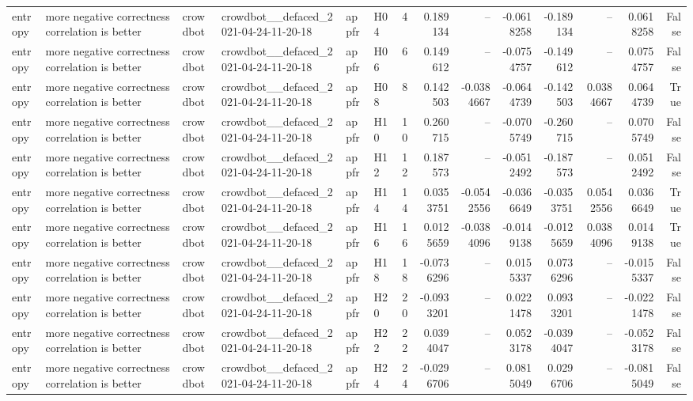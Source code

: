 \begin{longtable}{llllllrrrrrrrr}
entropy & more negative correctness correlation is better & crowdbot & crowdbot\_\_defaced\_2021-04-24-11-20-18 & appfr & H04 & 4 & 0.189134 & -- & -0.0618258 & -0.189134 & -- & 0.0618258 & False \\
entropy & more negative correctness correlation is better & crowdbot & crowdbot\_\_defaced\_2021-04-24-11-20-18 & appfr & H06 & 6 & 0.149612 & -- & -0.0754757 & -0.149612 & -- & 0.0754757 & False \\
entropy & more negative correctness correlation is better & crowdbot & crowdbot\_\_defaced\_2021-04-24-11-20-18 & appfr & H08 & 8 & 0.142503 & -0.0384667 & -0.0644739 & -0.142503 & 0.0384667 & 0.0644739 & True \\
entropy & more negative correctness correlation is better & crowdbot & crowdbot\_\_defaced\_2021-04-24-11-20-18 & appfr & H10 & 10 & 0.260715 & -- & -0.0705749 & -0.260715 & -- & 0.0705749 & False \\
entropy & more negative correctness correlation is better & crowdbot & crowdbot\_\_defaced\_2021-04-24-11-20-18 & appfr & H12 & 12 & 0.187573 & -- & -0.0512492 & -0.187573 & -- & 0.0512492 & False \\
entropy & more negative correctness correlation is better & crowdbot & crowdbot\_\_defaced\_2021-04-24-11-20-18 & appfr & H14 & 14 & 0.0353751 & -0.0542556 & -0.0366649 & -0.0353751 & 0.0542556 & 0.0366649 & True \\
entropy & more negative correctness correlation is better & crowdbot & crowdbot\_\_defaced\_2021-04-24-11-20-18 & appfr & H16 & 16 & 0.0125659 & -0.0384096 & -0.0149138 & -0.0125659 & 0.0384096 & 0.0149138 & True \\
entropy & more negative correctness correlation is better & crowdbot & crowdbot\_\_defaced\_2021-04-24-11-20-18 & appfr & H18 & 18 & -0.0736296 & -- & 0.0155337 & 0.0736296 & -- & -0.0155337 & False \\
entropy & more negative correctness correlation is better & crowdbot & crowdbot\_\_defaced\_2021-04-24-11-20-18 & appfr & H20 & 20 & -0.0933201 & -- & 0.0221478 & 0.0933201 & -- & -0.0221478 & False \\
entropy & more negative correctness correlation is better & crowdbot & crowdbot\_\_defaced\_2021-04-24-11-20-18 & appfr & H22 & 22 & 0.0394047 & -- & 0.0523178 & -0.0394047 & -- & -0.0523178 & False \\
entropy & more negative correctness correlation is better & crowdbot & crowdbot\_\_defaced\_2021-04-24-11-20-18 & appfr & H24 & 24 & -0.0296706 & -- & 0.0815049 & 0.0296706 & -- & -0.0815049 & False \\

\end{longtable}
